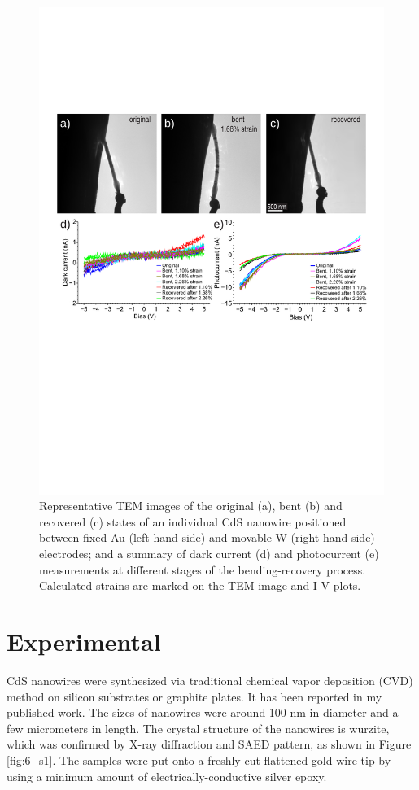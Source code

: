 \begin{figure}  
\includegraphics[width=\textwidth]{figures/figure6_2}
\caption[Deformation and I-V measurements]
{Representative TEM images of the original (a), bent (b) and recovered (c) states of an individual CdS nanowire positioned between fixed Au (left hand side) and movable W (right hand side) electrodes; and a summary of dark current (d) and photocurrent (e) measurements at different stages of the bending-recovery process. Calculated strains are marked on the TEM image and I-V plots. 
\label{fig:6_2}}
\end{figure}

\section{Experimental}
CdS nanowires were synthesized via traditional chemical vapor deposition (CVD) method on silicon substrates or graphite plates. It has been reported in my published work.\cite{Zhang2015} 
The sizes of nanowires were around 100 nm in diameter and a few micrometers in length. 
The crystal structure of the nanowires is wurzite, which was confirmed by X-ray diffraction and SAED pattern, as shown in Figure \ref{fig:6_s1}. 
The samples were put onto a freshly-cut flattened gold wire tip by using a minimum amount of electrically-conductive silver epoxy. \\

